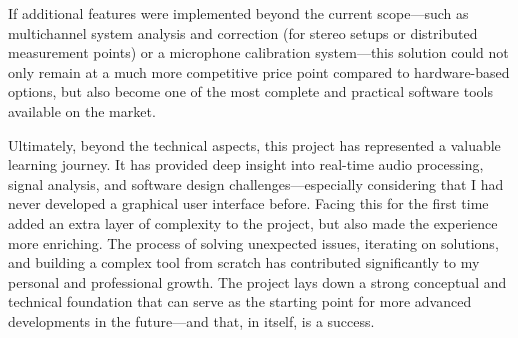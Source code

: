 If additional features were implemented beyond the current scope—such as multichannel system analysis and correction (for stereo setups or distributed measurement points) or a microphone calibration system—this solution could not only remain at a much more competitive price point compared to hardware-based options, but also become one of the most complete and practical software tools available on the market.

Ultimately, beyond the technical aspects, this project has represented a valuable learning journey. It has provided deep insight into real-time audio processing, signal analysis, and software design challenges—especially considering that I had never developed a graphical user interface before. Facing this for the first time added an extra layer of complexity to the project, but also made the experience more enriching. The process of solving unexpected issues, iterating on solutions, and building a complex tool from scratch has contributed significantly to my personal and professional growth. The project lays down a strong conceptual and technical foundation that can serve as the starting point for more advanced developments in the future—and that, in itself, is a success.




